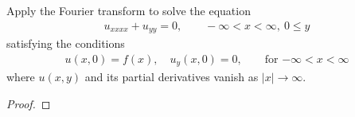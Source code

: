 \begin{problem}{2.47}
  Apply the Fourier transform to solve the equation
  \begin{align*}
    u_{xxxx}+u_{yy} = 0, \qquad -\infty< x < \infty,\ 0 \leq y
  \end{align*}
  satisfying the conditions
  \begin{align*}
    u(x, 0) = f(x), \quad u_y(x,0) = 0, \qquad \text{for $-\infty < x < \infty$}
  \end{align*}
  where $u(x, y)$ and its partial derivatives vanish as $|x| \to \infty$.
\end{problem}

\begin{proof}
\end{proof}
\newpage
